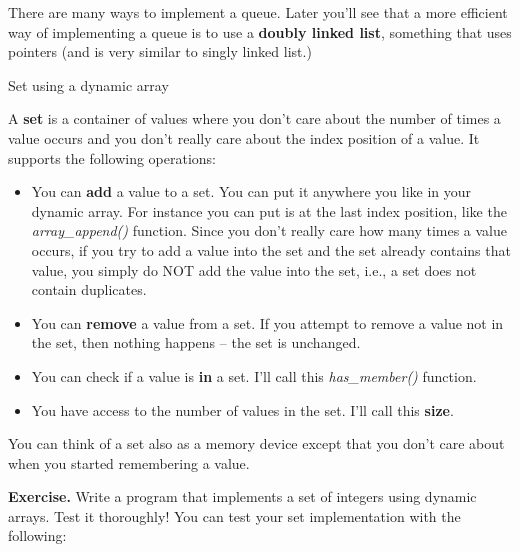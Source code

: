 \documentclass[
]{article}
\providecommand{\tightlist}{%
  \setlength{\itemsep}{0pt}\setlength{\parskip}{0pt}}
\begin{document}
There are many ways to implement a queue. Later you'll see that a more
efficient way of implementing a queue is to use a \textbf{doubly linked
list}, something that uses pointers (and is very similar to singly
linked list.)

Set using a dynamic array

A \textbf{set} is a container of values where you don't care about the
number of times a value occurs and you don't really care about the index
position of a value. It supports the following operations:

\begin{itemize}
\tightlist
\item
  You can \textbf{add} a value to a set. You can put it anywhere you
  like in your dynamic array. For instance you can put is at the last
  index position, like the \emph{array\_append()} function. Since you
  don't really care how many times a value occurs, if you try to add a
  value into the set and the set already contains that value, you simply
  do NOT add the value into the set, i.e., a set does not contain
  duplicates.
\item
  You can \textbf{remove} a value from a set. If you attempt to remove a
  value not in the set, then nothing happens -- the set is unchanged.
\item
  You can check if a value is \textbf{in} a set. I'll call this
  \emph{has\_member()} function.
\item
  You have access to the number of values in the set. I'll call this
  \textbf{size}.
\end{itemize}

You can think of a set also as a memory device except that you don't
care about when you started remembering a value.

\textbf{Exercise.} Write a program that implements a set of integers
using dynamic arrays. Test it thoroughly! You can test your set
implementation with the following:
\end{document}
